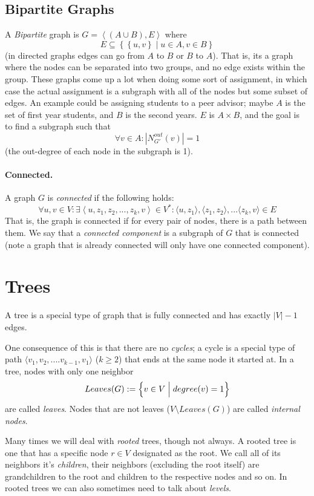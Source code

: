 \subsection{Bipartite Graphs}
A \emph{Bipartite} graph is $G=\left\langle \left(A\cup B\right), E \right\rangle$ 
where \[E\subseteq \left\{\left\{u,v\right\} \mid u\in A, v\in B\right\}\] (in directed graphs edges can go from $A$ to $B$ or $B$ to $A$). 
That is, its a graph where the nodes can be separated into two groups, and no edge exists within the group.  
These graphs come up a lot when doing some sort of assignment, in which case the actual assignment is a subgraph with all of the nodes but some subset of edges.
An example could be assigning students to a peer advisor; 
maybe $A$ is the set of first year students, and $B$ is the second years. 
$E$ is $A\times B$, and the goal is to find a subgraph such that 
\[\forall v \in A: |N^{out}_{G'}(v)|=1\]
(the out-degree of each node in the subgraph is 1).


\paragraph{Connected.} 
A graph $G$ is \emph{connected} if the following holds:
\[ \forall u,v \in V : \exists \left\langle u,z_1,z_2,...,z_k,v \right\rangle \in V^* : \langle u,z_1 \rangle, \langle z_1,z_2 \rangle, ... \langle z_k,v \rangle \in E  \]
That is, the graph is connected if for every pair of nodes, there is a path between them. 
We say that a \emph{connected component} is a subgraph of $G$ that is connected 
(note a graph that is already connected will only have one connected component). 


\section{Trees}
A tree is a special type of graph that is fully connected and has exactly $|V|-1$ edges. 

One consequence of this is that there are no \emph{cycles};
a cycle is a special type of path $\langle v_1, v_2,.... v_{k-1}, v_1\rangle$ ($k\ge 2$) that ends at the same node it started at. 
In a tree, nodes with only one neighbor \[Leaves(G) := \Bigl\{v \in V \;\Big|\; degree(v) =1\Bigr\}\] are called \emph{leaves}. 
Nodes that are not leaves ($V\setminus Leaves(G)$)  are called \emph{internal nodes}.

Many times we will deal with \emph{rooted} trees, though not always. 
A rooted tree is one that has a specific node $r\in V$ designated as the root. 
We call all of its neighbors it's \emph{children}, their neighbors (excluding the root itself) are grandchildren to the root and children to the respective nodes and so on. 
In rooted trees we can also sometimes need to talk about \emph{levels}. 

